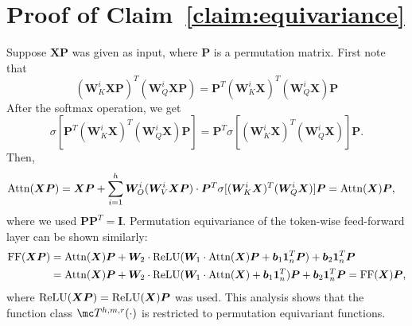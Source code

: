 \documentclass{article} %
\def\vone{{\bm{1}}}
\def\vb{{\bm{b}}}
\def\mI{{\bm{I}}}
\def\mP{{\bm{P}}}
\def\mW{{\bm{W}}}
\def\mX{{\bm{X}}}
\newcommand{\sfmx}{\sigma}
\newcommand{\relu}{{\rm ReLU}}
\newcommand{\attn}{{\rm Attn}}
\newcommand{\ff}{{\rm FF}}
\begin{document}




\section{Proof of Claim~\ref{claim:equivariance}}
\label{sec:proof_equivariance}
Suppose $\mX \mP$ was given as input, where $\mP$ is a permutation matrix.
First note that 
\begin{equation*}
(\mW_K^i \mX \mP)^T (\mW_Q^i \mX \mP) = \mP^T (\mW_K^i \mX)^T (\mW_Q^i \mX) \mP    
\end{equation*}
After the softmax operation, we get 
\begin{equation*}
\sfmx[\mP^T (\mW_K^i \mX)^T (\mW_Q^i \mX) \mP] = \mP^T \sfmx[ (\mW_K^i \mX)^T (\mW_Q^i \mX) ] \mP.
\end{equation*}
Then,
\begin{align*}
    \attn(\mX \mP) &= \mX \mP + \sum_{i=1}^h \mW_O^i (\mW_V^i \mX \mP) \cdot \mP^T \sfmx [ (\mW_K^i \mX)^T (\mW_Q^i \mX) ] \mP = \attn(\mX) \mP,
\end{align*}
where we used $\mP \mP^T = \mI$. Permutation equivariance of the token-wise feed-forward layer can be shown similarly:
\begin{align*}
    \ff(\mX \mP) &= \attn(\mX)\mP + \mW_2 \cdot \relu (\mW_1 \cdot \attn(\mX)\mP + \vb_1 \vone_n^T \mP) + \vb_2 \vone_n^T \mP\\
    &= \attn(\mX)\mP + \mW_2 \cdot \relu (\mW_1 \cdot \attn(\mX) + \vb_1 \vone_n^T) \mP + \vb_2 \vone_n^T \mP = \ff(\mX)\mP,
\end{align*}
where $\relu(\mX \mP) = \relu(\mX) \mP$ was used.
This analysis shows that the function class $\mc T^{h,m,r}(\cdot)$ is restricted to permutation equivariant functions.
\end{document}
